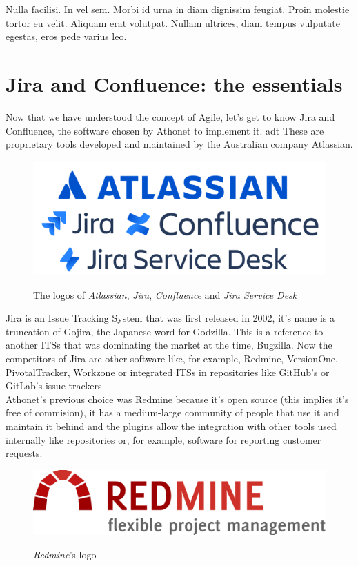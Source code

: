\begin{savequote}[75mm]
Nulla facilisi. In vel sem. Morbi id urna in diam dignissim feugiat. Proin molestie tortor eu velit. Aliquam erat volutpat. Nullam ultrices, diam tempus vulputate egestas, eros pede varius leo.
\end{savequote}

\chapter{Jira and Confluence: the essentials}
	
	Now that we have understood the concept of Agile, let's get to know Jira and Confluence, the software chosen by Athonet to implement it. \gls{adt}
	These are proprietary tools developed and maintained by the Australian company Atlassian.
	\begin{figure}[H]
		\centering
		\includegraphics[width=.7\textwidth]{resources/atlassian_logo}\\
		\caption{The logos of \textit{Atlassian}, \textit{Jira}, \textit{Confluence} and \textit{Jira Service Desk}}
	\end{figure}
	Jira is an Issue Tracking System that was first released in 2002, it's name is a truncation of Gojira, the Japanese word for Godzilla.
	This is a reference to another ITSs that was dominating the market at the time, Bugzilla.
	Now the competitors of Jira are other software like, for example, Redmine, VersionOne, PivotalTracker, Workzone or integrated ITSs in repositories like GitHub's or GitLab's issue trackers.\\
	Athonet's previous choice was Redmine because it's open source (this implies it's free of commision), it has a medium-large community of people that use it and maintain it behind and the plugins allow the integration with other tools used internally like repositories or, for example, software for reporting customer requests.
	\begin{figure}[H]
		\centering
		\includegraphics[width=.6\textwidth]{resources/redmine_logo}\\
		\caption{\textit{Redmine}'s logo}
	\end{figure}
